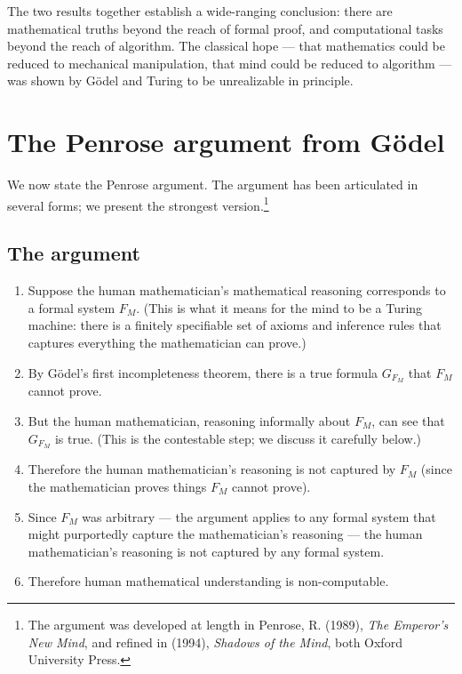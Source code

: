 The two results together establish a wide-ranging conclusion: there
are mathematical truths beyond the reach of formal proof, and
computational tasks beyond the reach of algorithm. The classical
hope --- that mathematics could be reduced to mechanical
manipulation, that mind could be reduced to algorithm --- was
shown by G\"odel and Turing to be unrealizable in principle.

\section{The Penrose argument from G\"odel}
\label{sec:penrose-argument}

We now state the Penrose argument. The argument has been articulated
in several forms; we present the strongest version.\footnote{The
argument was developed at length in Penrose, R. (1989), \emph{The
Emperor's New Mind}, and refined in (1994), \emph{Shadows of the
Mind}, both Oxford University Press.}

\subsection{The argument}

\begin{enumerate}[leftmargin=2em]
    \item Suppose the human mathematician's mathematical reasoning
    corresponds to a formal system $F_M$. (This is what it means
    for the mind to be a Turing machine: there is a finitely
    specifiable set of axioms and inference rules that captures
    everything the mathematician can prove.)
    \item By G\"odel's first incompleteness theorem, there is a true
    formula $G_{F_M}$ that $F_M$ cannot prove.
    \item But the human mathematician, reasoning informally about
    $F_M$, can see that $G_{F_M}$ is true. (This is the contestable
    step; we discuss it carefully below.)
    \item Therefore the human mathematician's reasoning is not
    captured by $F_M$ (since the mathematician proves things $F_M$
    cannot prove).
    \item Since $F_M$ was arbitrary --- the argument applies to
    any formal system that might purportedly capture the
    mathematician's reasoning --- the human mathematician's
    reasoning is not captured by any formal system.
    \item Therefore human mathematical understanding is
    non-computable.
\end{enumerate}

